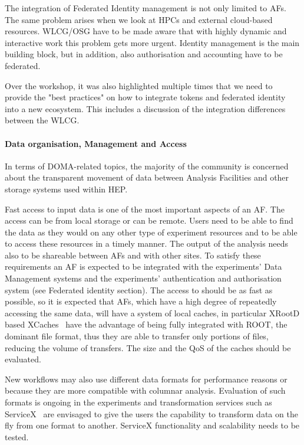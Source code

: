\documentclass[a4paper,11pt]{article}
\begin{document}
The integration of Federated Identity management is not only limited to
AFs. The same problem arises when we look at HPCs and external
cloud-based resources. WLCG/OSG have to be made aware that with highly
dynamic and interactive work this problem gets more urgent. Identity
management is the main building block, but in addition, also
authorisation and accounting have to be federated.

Over the workshop, it was also highlighted multiple times that we need
to provide the "best practices" on how to integrate tokens and
federated identity into a new ecosystem. This includes a discussion of
the integration differences between the WLCG.

\hypertarget{data-organisation-management-and-access}{%
\paragraph{Data organisation, Management and
Access}\label{data-organisation-management-and-access}}

In terms of DOMA-related topics, the majority of the community is
concerned about the transparent movement of data between Analysis Facilities
and other storage systems used within HEP.

Fast access to input data is one of the most important aspects of an AF.
The access can be from local storage or can be remote. Users need to be
able to find the data as they would on any other type of experiment
resources and to be able to access these resources in a timely manner.
The output of the analysis needs also to be shareable between AFs and
with other sites. To satisfy these requirements an AF is expected to be
integrated with the experiments' Data Management systems and the
experiments' authentication and authorisation system (see Federated
identity section). The access to should be as fast as possible, so it is
expected that AFs, which have a high degree of repeatedly accessing the
same data, will have a system of local caches, in particular XRootD
based XCaches~\cite{fajardo2020creating} have the advantage of being fully integrated with ROOT,
the dominant file format, thus they are able to transfer only portions
of files, reducing the volume of transfers. The size and the QoS of the
caches should be evaluated.

New workflows may also use different data formats for performance
reasons or because they are more compatible with columnar analysis.
Evaluation of such formats is ongoing in the experiments and
transformation services such as ServiceX~\cite{galewsky2020servicex} are envisaged to give the users the capability to transform data on the fly from one format to another.
ServiceX functionality and scalability needs to be tested.
\end{document}
